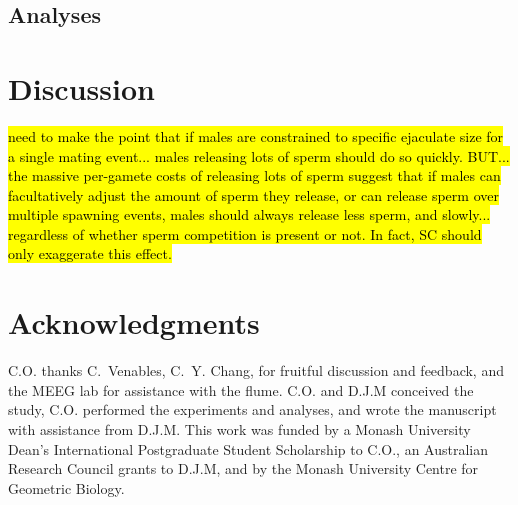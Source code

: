 \documentclass{article}
\begin{document}
	\subsection*{Analyses}


\section*{Discussion}

\hl{need to make the point that if males are constrained to specific ejaculate size for a single mating event... males releasing lots of sperm should do so quickly.  BUT... the massive per-gamete costs of releasing lots of sperm suggest that if males can facultatively adjust the amount of sperm they release, or can release sperm over multiple spawning events, males should always release less sperm, and slowly... regardless of whether sperm competition is present or not. In fact, SC should only exaggerate this effect.}



\section*{Acknowledgments}
C.O. thanks C.~Venables, C.~Y. Chang, for fruitful discussion and feedback, and the MEEG lab for assistance with the flume. C.O. and D.J.M conceived the study, C.O. performed the experiments and analyses, and wrote the manuscript with assistance from D.J.M. This work was funded by a Monash University Dean's International Postgraduate Student Scholarship to C.O., an Australian Research Council grants to D.J.M, and by the Monash University Centre for Geometric Biology.

\newpage{}




\end{document}
